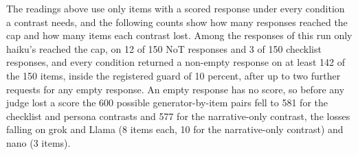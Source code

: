 The readings above use only items with a scored response under every
condition a contrast needs, and the following counts show how many responses
reached the cap and how many items each contrast lost.
Among the responses of this run only haiku's reached the cap, on 12 of 150
NoT responses and 3 of 150 checklist responses, and every condition returned
a non-empty response on at least 142 of the 150 items, inside the registered
guard of 10 percent, after up to two further requests for any empty
response. An empty response has no score, so before any judge lost a score
the 600 possible generator-by-item pairs fell to 581 for the checklist and
persona contrasts and 577 for the narrative-only contrast, the losses falling
on grok and Llama (8 items each, 10 for the narrative-only contrast) and
nano (3 items).

